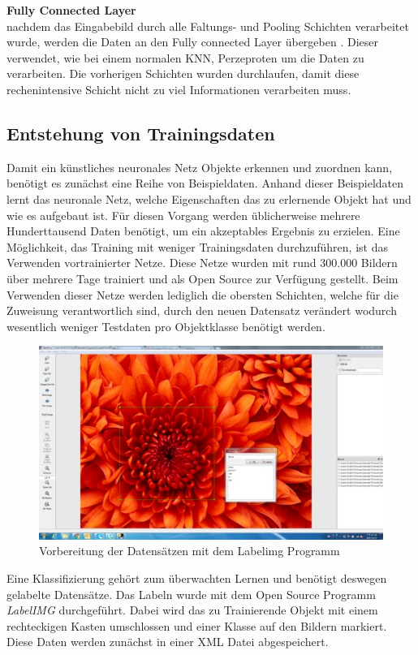 \textbf{Fully Connected Layer}\\
nachdem das Eingabebild durch alle Faltungs- und Pooling Schichten verarbeitet wurde, werden die Daten an den Fully connected Layer übergeben \cite[14]{sermanet2012convolutional}. Dieser verwendet, wie bei einem normalen KNN, Perzeproten um die Daten zu verarbeiten. Die vorherigen Schichten wurden durchlaufen, damit diese rechenintensive Schicht nicht zu viel Informationen verarbeiten muss. 
  \subsection{Entstehung von Trainingsdaten}\label{s.trainingsdaten} 
Damit ein künstliches neuronales Netz Objekte erkennen und zuordnen kann, benötigt es zunächst eine Reihe von Beispieldaten. Anhand dieser Beispieldaten lernt das neuronale Netz, welche Eigenschaften das zu erlernende Objekt hat und wie es aufgebaut ist. Für diesen Vorgang werden üblicherweise mehrere Hunderttausend Daten benötigt, um ein akzeptables Ergebnis zu erzielen. Eine Möglichkeit, das Training mit weniger Trainingsdaten durchzuführen, ist das Verwenden vortrainierter Netze. Diese Netze wurden mit rund 300.000 Bildern über mehrere Tage trainiert und als Open Source zur Verfügung gestellt. Beim Verwenden dieser Netze werden lediglich die obersten Schichten, welche für die Zuweisung verantwortlich sind, durch den neuen Datensatz verändert wodurch wesentlich weniger Testdaten pro Objektklasse benötigt werden. 
\begin{figure}
	[h]
	\centering
	\includegraphics[scale=0.7]{Sources/labelimg.jpg}
	\caption{Vorbereitung der Datensätzen mit dem Labelimg Programm \cite{labelimg2019}}
	\label{img:labelimg}
\end{figure}
Eine Klassifizierung gehört zum überwachten Lernen und benötigt deswegen gelabelte Datensätze. Das Labeln wurde mit dem Open Source Programm \textit{LabelIMG} \cite{labelimg2019} durchgeführt. Dabei wird das zu Trainierende Objekt mit einem rechteckigen Kasten umschlossen und einer Klasse auf den Bildern markiert. Diese Daten werden zunächst in einer XML Datei abgespeichert. 
